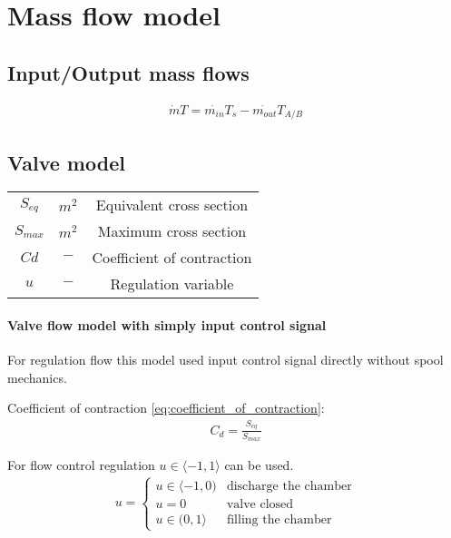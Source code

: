 \section{Mass flow model}

\subsection{Input/Output mass flows}

\begin{align}
    \dot{m}T = \dot{m_{in}}T_s - \dot{m_{out}}T_{A/B}
\end{align}




\subsection{Valve model} %
\begin{tabular}{ |c|c|c| }
    \hline
    $S_{eq}$                & $m^2$         & Equivalent cross section \\
    $S_{max}$               & $m^2$         & Maximum cross section \\
    $Cd$                    & $-$           & Coefficient of contraction \\
    $u$                     & $-$           & Regulation variable \\
    \hline
\end{tabular}

\paragraph{Valve flow model with simply input control signal}
For regulation flow this model used input control signal directly without
spool mechanics.

Coefficient of contraction \ref{eq:coefficient_of_contraction}:
\begin{align}
    C_d = \frac{S_{eq}}{S_{max}}
    \label{eq:coefficient_of_contraction}
\end{align}

For flow control regulation $u \in \langle-1,1\rangle$ can be used.
\begin{align}
    u =
    \begin{cases}
        u \in \langle -1, 0) & \text{discharge the chamber} \\
        u = 0& \text{valve closed}  \\
        u \in (0, 1\rangle & \text{filling the chamber} 
    \end{cases}
\end{align} 

